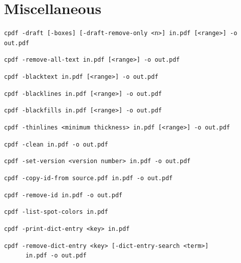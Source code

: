 \documentclass{book}
\begin{document}
\fi%

\clearpage\pagestyle{empty}
\chapter{Miscellaneous}\label{chap:misc}\pagestyle{fancy}
  {\small\begin{framed}
  \noindent\verb!cpdf -draft [-boxes] [-draft-remove-only <n>] in.pdf [<range>] -o out.pdf!

  \vspace{1.5mm}
  \noindent\verb!cpdf -remove-all-text in.pdf [<range>] -o out.pdf!

  \vspace{1.5mm}
  \noindent\verb!cpdf -blacktext in.pdf [<range>] -o out.pdf!

  \vspace{1.5mm}
  \noindent\verb!cpdf -blacklines in.pdf [<range>] -o out.pdf!

  \vspace{1.5mm}
  \noindent\verb!cpdf -blackfills in.pdf [<range>] -o out.pdf!

  \vspace{1.5mm}
  \noindent\verb!cpdf -thinlines <minimum thickness> in.pdf [<range>] -o out.pdf!

  \vspace{1.5mm}
  \noindent\verb!cpdf -clean in.pdf -o out.pdf!

  \vspace{1.5mm}
  \noindent\verb!cpdf -set-version <version number> in.pdf -o out.pdf!

  \vspace{1.5mm}
  \noindent\verb!cpdf -copy-id-from source.pdf in.pdf -o out.pdf!

  \vspace{1.5mm}
  \noindent\verb!cpdf -remove-id in.pdf -o out.pdf!

  \vspace{1.5mm}
  \noindent\verb!cpdf -list-spot-colors in.pdf!

  \vspace{1.5mm}
  \noindent\verb!cpdf -print-dict-entry <key> in.pdf!

  \vspace{1.5mm}
  \noindent\verb!cpdf -remove-dict-entry <key> [-dict-entry-search <term>]!\\
  \noindent\verb!      in.pdf -o out.pdf!


\end{framed}}
\end{document}
